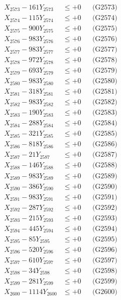 \documentclass[a4paper,10pt]{article}
\begin{document}
{\begin{align}
X_{2573} - 161Y_{2573} &\leq +0 && \text{(G2573)} \\
X_{2574} - 115Y_{2574} &\leq +0 && \text{(G2574)} \\
X_{2575} - 900Y_{2575} &\leq +0 && \text{(G2575)} \\
X_{2576} - 983Y_{2576} &\leq +0 && \text{(G2576)} \\
X_{2577} - 983Y_{2577} &\leq +0 && \text{(G2577)} \\
X_{2578} - 972Y_{2578} &\leq +0 && \text{(G2578)} \\
X_{2579} - 693Y_{2579} &\leq +0 && \text{(G2579)} \\
X_{2580} - 983Y_{2580} &\leq +0 && \text{(G2580)} \\
\allowbreak
X_{2581} - 318Y_{2581} &\leq +0 && \text{(G2581)} \\
X_{2582} - 983Y_{2582} &\leq +0 && \text{(G2582)} \\
X_{2583} - 190Y_{2583} &\leq +0 && \text{(G2583)} \\
X_{2584} - 288Y_{2584} &\leq +0 && \text{(G2584)} \\
X_{2585} - 321Y_{2585} &\leq +0 && \text{(G2585)} \\
X_{2586} - 818Y_{2586} &\leq +0 && \text{(G2586)} \\
X_{2587} - 21Y_{2587} &\leq +0 && \text{(G2587)} \\
X_{2588} - 146Y_{2588} &\leq +0 && \text{(G2588)} \\
X_{2589} - 983Y_{2589} &\leq +0 && \text{(G2589)} \\
X_{2590} - 386Y_{2590} &\leq +0 && \text{(G2590)} \\
\allowbreak
X_{2591} - 983Y_{2591} &\leq +0 && \text{(G2591)} \\
X_{2592} - 287Y_{2592} &\leq +0 && \text{(G2592)} \\
X_{2593} - 215Y_{2593} &\leq +0 && \text{(G2593)} \\
X_{2594} - 445Y_{2594} &\leq +0 && \text{(G2594)} \\
X_{2595} - 85Y_{2595} &\leq +0 && \text{(G2595)} \\
X_{2596} - 520Y_{2596} &\leq +0 && \text{(G2596)} \\
X_{2597} - 610Y_{2597} &\leq +0 && \text{(G2597)} \\
X_{2598} - 34Y_{2598} &\leq +0 && \text{(G2598)} \\
X_{2599} - 281Y_{2599} &\leq +0 && \text{(G2599)} \\
X_{2600} - 1114Y_{2600} &\leq +0 && \text{(G2600)} \\

\end{align}}
\end{document}
